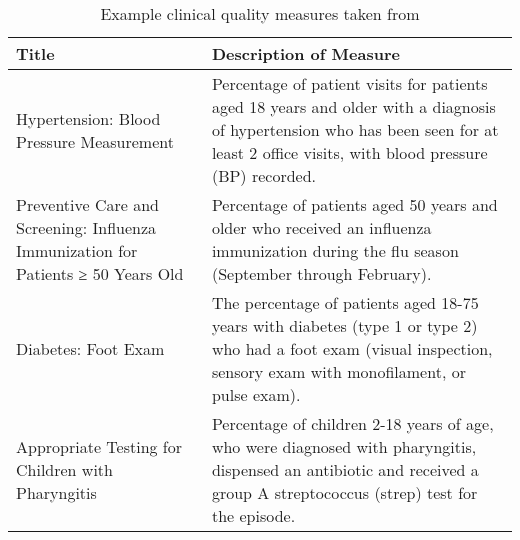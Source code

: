 \begin{table}
	\begin{tabular}{ |p{5cm}|p{12.5cm}| }
		\hline
		\textbf{Title} & \textbf{Description of Measure} \\
		\hline
		Hypertension: Blood Pressure Measurement & Percentage of patient visits for patients aged 18 years and older with a diagnosis of hypertension who has been seen for at least 2 office visits, with blood pressure (BP) recorded. \\
		\hline
		Preventive Care and Screening: Influenza Immunization for Patients ≥ 50 Years Old & Percentage of patients aged 50 years and older who received an influenza immunization during the flu season (September through February). \\
		\hline
		Diabetes: Foot Exam & The percentage of patients aged 18-75 years with diabetes (type 1 or type 2) who had a foot exam (visual inspection, sensory exam with monofilament, or pulse exam). \\
		\hline
		Appropriate Testing for Children with Pharyngitis & Percentage of children 2-18 years of age, who were diagnosed with pharyngitis, dispensed an antibiotic and received a group A streptococcus (strep) test for the episode. \\
		
		\hline
		\end{tabular}
		\label{table:cqm}
		\caption[Table caption text]{Example clinical quality measures taken from \cite{cqm-pdf}}
\end{table}
